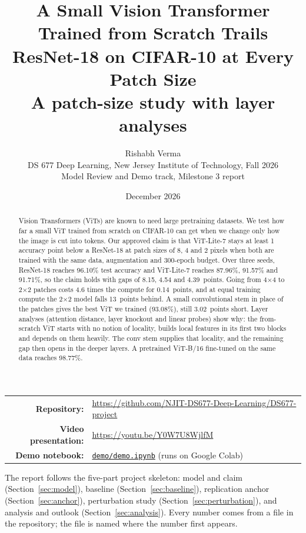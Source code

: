 \documentclass[11pt]{article}
\title{\textbf{A Small Vision Transformer Trained from Scratch Trails ResNet-18 on CIFAR-10 at Every Patch Size}\\[6pt]
\large A patch-size study with layer analyses}
\author{Rishabh Verma\\[2pt]
\normalsize DS 677 Deep Learning, New Jersey Institute of Technology, Fall 2026\\
\normalsize Model Review and Demo track, Milestone 3 report}
\date{December 2026}
\newcommand{\repourl}{https://github.com/NJIT-DS677-Deep-Learning/DS677-project}
\newcommand{\demourl}{https://github.com/NJIT-DS677-Deep-Learning/DS677-project/blob/main/demo/demo.ipynb}
\newcommand{\videolink}{\url{https://youtu.be/Y0W7U8WjlfM}}
\newcommand{\file}[1]{\nolinkurl{#1}}
\begin{document}
\maketitle

\begin{center}
\begin{tabular}{@{}rl@{}}
\textbf{Repository:} & \url{\repourl}\\
\textbf{Video presentation:} & \videolink\\
\textbf{Demo notebook:} & \href{\demourl}{\file{demo/demo.ipynb}} (runs on Google Colab)\\
\end{tabular}
\end{center}

\begin{abstract}
\noindent Vision Transformers (ViTs) are known to need large pretraining datasets. We test how far a small ViT trained from scratch on CIFAR-10 can get when we change only how the image is cut into tokens. Our approved claim is that ViT-Lite-7 stays at least 1 accuracy point below a ResNet-18 at patch sizes of 8, 4 and 2 pixels when both are trained with the same data, augmentation and 300-epoch budget. Over three seeds, ResNet-18 reaches 96.10\% test accuracy and ViT-Lite-7 reaches 87.96\%, 91.57\% and 91.71\%, so the claim holds with gaps of 8.15, 4.54 and 4.39~points. Going from 4$\times$4 to 2$\times$2 patches costs 4.6 times the compute for 0.14~points, and at equal training compute the 2$\times$2 model falls 13~points behind. A small convolutional stem in place of the patches gives the best ViT we trained (93.08\%), still 3.02~points short. Layer analyses (attention distance, layer knockout and linear probes) show why: the from-scratch ViT starts with no notion of locality, builds local features in its first two blocks and depends on them heavily. The conv stem supplies that locality, and the remaining gap then opens in the deeper layers. A pretrained ViT-B/16 fine-tuned on the same data reaches 98.77\%.
\end{abstract}

\noindent The report follows the five-part project skeleton: model and claim (Section~\ref{sec:model}), baseline (Section~\ref{sec:baseline}), replication anchor (Section~\ref{sec:anchor}), perturbation study (Section~\ref{sec:perturbation}), and analysis and outlook (Section~\ref{sec:analysis}). Every number comes from a file in the repository; the file is named where the number first appears.

\end{document}

